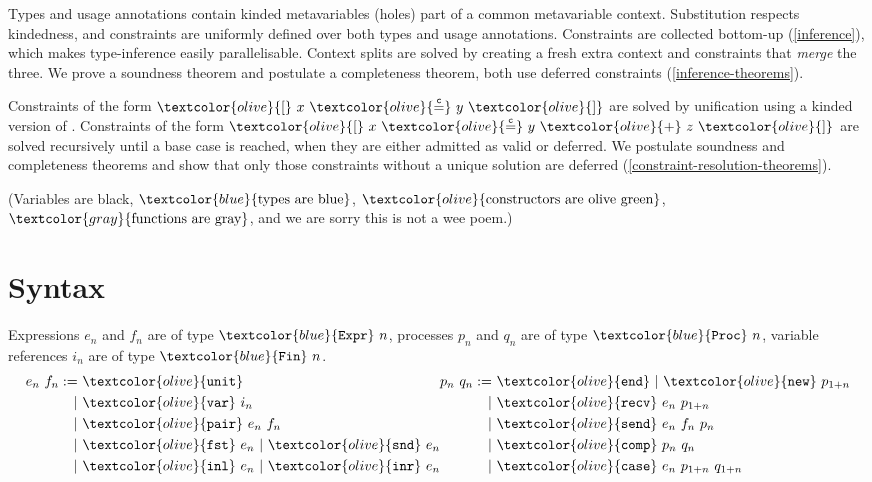 \documentclass[sigplan,screen,review]{acmart}
\newcommand{\constr}[1]{\textcolor{olive}{\mathtt{#1}}}
\newcommand{\func}[1]{\textcolor{gray}{\mathtt{#1}}}
\newcommand{\type}[1]{\textcolor{blue}{\mathtt{#1}}}
\newcommand{\Fin}[1]{\type{Fin}~#1}
\newcommand{\sExpr}[1]{\type{Expr}~#1}
\newcommand{\sProc}[1]{\type{Proc}~#1}
\newcommand{\sunit}{\constr{unit}}
\newcommand{\svar}{\constr{var}}
\newcommand{\sfst}{\constr{fst}}
\newcommand{\ssnd}{\constr{snd}}
\newcommand{\sinl}{\constr{inl}}
\newcommand{\sinr}{\constr{inr}}
\newcommand{\spair}{\constr{pair}}
\newcommand{\send}{\constr{end}}
\newcommand{\snew}{\constr{new}}
\newcommand{\scomp}{\constr{comp}}
\newcommand{\srecv}{\constr{recv}}
\newcommand{\ssend}{\constr{send}}
\newcommand{\scase}{\constr{case}}
\newcommand{\eqconstr}[2]{\constr{[} ~ #1 ~ \constr{\stackrel{c}{=}} ~ #2 ~ \constr{]}}
\newcommand{\sumconstr}[3]{\constr{[} ~ #1 ~ \constr{\stackrel{c}{=}} ~ #2 ~ \constr{+} ~ #3 ~ \constr{]}}
\begin{document}
Types and usage annotations contain kinded metavariables (holes) part of a common metavariable context.
Substitution respects kindedness, and constraints are uniformly defined over both types and usage annotations.
Constraints are collected bottom-up (\autoref{inference}), which makes type-inference easily parallelisable.
Context splits are solved by creating a fresh extra context and constraints that \emph{merge} the three.
We prove a soundness theorem and postulate a completeness theorem, both use deferred constraints (\autoref{inference-theorems}).

Constraints of the form $\eqconstr{x}{y}$ are solved by unification using a kinded version of \cite{McBride03}.
Constraints of the form $\sumconstr{x}{y}{z}$ are solved recursively until a base case is reached, when they are either admitted as valid or deferred.
We postulate soundness and completeness theorems and show that only those constraints without a unique solution are deferred (\autoref{constraint-resolution-theorems}).

(Variables are black, $\type{\textrm{types are blue}}$, $\constr{\textrm{constructors are olive green}}$, $\func{\textrm{functions are gray}}$, and we are sorry this is not a wee poem.)


\section{Syntax}\label{syntax}

Expressions $e_n$ and $f_n$ are of type $\sExpr{n}$, processes $p_n$ and $q_n$ are of type $\sProc{n}$, variable references $i_n$ are of type $\Fin{n}$.
\[
\begin{aligned}[c]
  e_n ~ f_n  :=
  &~ \sunit \\
  |&~ \svar~i_n \\
  |&~ \spair~e_n~f_n \\
  |&~ \sfst~e_n ~|~  \ssnd~e_n \\
  |&~ \sinl~e_n ~|~  \sinr~e_n
\end{aligned}
\begin{aligned}[c]
  p_n ~ q_n  :=
  &~ \send ~|~  \snew~p_{1+n} \\
  |&~ \srecv~e_n~p_{1+n} \\
  |&~ \ssend~e_n~f_n~p_n \\
  |&~ \scomp~p_n~q_n \\
  |&~ \scase~e_n~p_{1+n}~q_{1+n}
\end{aligned}
\]
\end{document}
